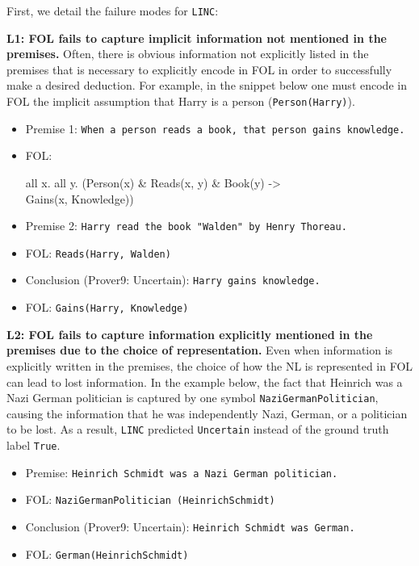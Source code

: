 First, we detail the failure modes for \texttt{LINC}:

\textbf{L1: FOL fails to capture implicit information not mentioned in the premises.} Often, there is obvious information not explicitly listed in the premises that is necessary to explicitly encode in FOL in order to successfully make a desired deduction. For example, in the snippet below one must encode in FOL the implicit assumption that Harry is a person (\texttt{Person(Harry)}).

\begin{itemize}
\itemsep0.1em
    \item[] \small Premise 1: \texttt{When a person reads a book, that person gains knowledge.}
    \item[] \small FOL: \parbox[t]{0.78\linewidth}{\ttfamily\small all x. all y. (Person(x) \& Reads(x, y) \& Book(y) ->\\ Gains(x, Knowledge))}
    \item[] \small Premise 2: \texttt{Harry read the book "Walden" by Henry Thoreau.}
    \item[] \small FOL: \texttt{Reads(Harry, Walden)}
    \item[] \small Conclusion (Prover9: Uncertain): \texttt{Harry gains knowledge.}
    \item[] \small FOL: \texttt{Gains(Harry, Knowledge)}
\end{itemize}


\textbf{L2: FOL fails to capture information explicitly mentioned in the premises due to the choice of representation.} Even when information is explicitly written in the premises, the choice of how the NL is represented in FOL can lead to lost information. In the example below, the fact that Heinrich was a Nazi German politician is captured by one symbol \texttt{NaziGermanPolitician}, causing the information that he was independently Nazi, German, or a politician to be lost.
As a result, \texttt{LINC} predicted \texttt{Uncertain} instead of the ground truth label \texttt{True}.

\begin{itemize}
\itemsep0.1em
    \item[] \small Premise: \texttt{Heinrich Schmidt was a Nazi German politician.}
    \item[] \small FOL: \texttt{NaziGermanPolitician (HeinrichSchmidt)}
    \item[] \small Conclusion (Prover9: Uncertain): \texttt{Heinrich Schmidt was German.}
    \item[] \small FOL: \texttt{German(HeinrichSchmidt)}
\end{itemize}

